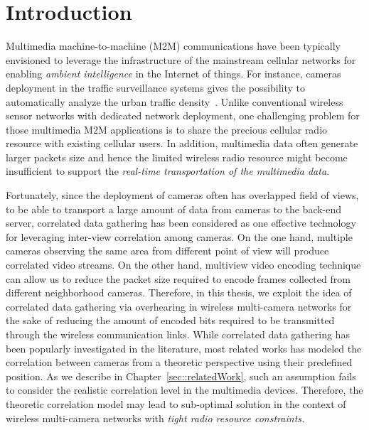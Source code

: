\chapter{Introduction}
\label{sec::introduction}
Multimedia machine-to-machine (M2M) communications have been typically envisioned to leverage the infrastructure of the mainstream cellular networks for enabling {\em ambient intelligence} in the Internet of things.
For instance, cameras deployment in the traffic surveillance systems gives the possibility to automatically analyze the urban traffic density~\cite{Kapsch,Traficon,Citilog}.
%
Unlike conventional wireless sensor networks with dedicated network deployment, one challenging problem for those multimedia M2M applications is to share the precious cellular radio resource with existing cellular users.
%
In addition, multimedia data often generate larger packets size and hence the limited wireless radio resource might become insufficient to support the {\em real-time transportation of the multimedia data}.

Fortunately, since the deployment of cameras often has overlapped field of views, to be able to transport a large amount of data from cameras to the back-end server, correlated data gathering has been considered as one effective technology for leveraging inter-view correlation among cameras.
On the one hand, multiple cameras observing the same area from different point of view will produce correlated video streams. 
On the other hand, multiview video encoding technique can allow us to reduce the packet size required to encode frames collected from different neighborhood cameras.
Therefore, in this thesis, we exploit the idea of correlated data gathering via overhearing in wireless multi-camera networks for the sake of reducing the amount of encoded bits required to be transmitted through the wireless communication links.
%
While correlated data gathering has been popularly investigated in the literature, most related works has modeled the correlation between cameras from a theoretic perspective using their predefined position.
As we describe in Chapter~\ref{sec::relatedWork}, such an assumption fails to consider the realistic correlation level in the multimedia devices.
Therefore, the theoretic correlation model may lead to sub-optimal solution in the context of wireless multi-camera networks with {\em tight radio resource constraints.}

